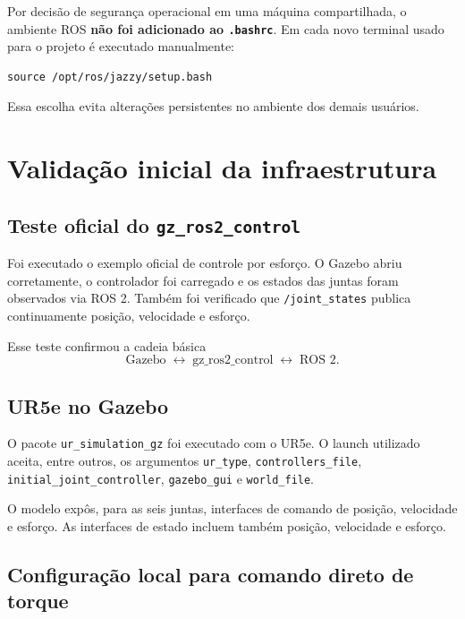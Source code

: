 \documentclass[11pt,a4paper]{article}
\begin{document}
Por decisão de segurança operacional em uma máquina compartilhada, o ambiente ROS \textbf{não foi adicionado ao \texttt{.bashrc}}. Em cada novo terminal usado para o projeto é executado manualmente:
\begin{lstlisting}
source /opt/ros/jazzy/setup.bash
\end{lstlisting}

Essa escolha evita alterações persistentes no ambiente dos demais usuários.

\section{Validação inicial da infraestrutura}

\subsection{Teste oficial do \texttt{gz\_ros2\_control}}

Foi executado o exemplo oficial de controle por esforço. O Gazebo abriu corretamente, o controlador foi carregado e os estados das juntas foram observados via ROS 2. Também foi verificado que \texttt{/joint\_states} publica continuamente posição, velocidade e esforço.

Esse teste confirmou a cadeia básica
\begin{equation}
\boxed{\text{Gazebo}}\;\leftrightarrow\;\boxed{\text{gz\_ros2\_control}}\;\leftrightarrow\;\boxed{\text{ROS 2}}.
\end{equation}

\subsection{UR5e no Gazebo}

O pacote \texttt{ur\_simulation\_gz} foi executado com o UR5e. O launch utilizado aceita, entre outros, os argumentos \texttt{ur\_type}, \texttt{controllers\_file}, \texttt{initial\_joint\_controller}, \texttt{gazebo\_gui} e \texttt{world\_file}.

O modelo expôs, para as seis juntas, interfaces de comando de posição, velocidade e esforço. As interfaces de estado incluem também posição, velocidade e esforço.

\subsection{Configuração local para comando direto de torque}
\end{document}
